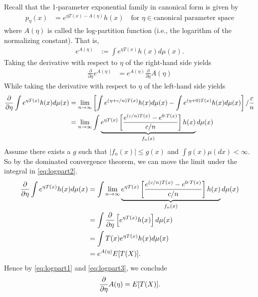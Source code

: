 \documentclass[twoside]{article}
\begin{document}
\begin{example}
Recall that the 1-parameter exponential family in canonical form is given by
\begin{align*}
  p_\eta(x) &= e^{\eta T(x) - A(\eta)} h(x) \quad \text{for }
  \eta \in \text{canonical parameter space}
\end{align*}
where $A(\eta)$ is called the log-partition function (i.e., the
logarithm of the normalizing constant).  That is,
\begin{align*}
  e^{A(\eta)} &:= \int e^{\eta T(x)} h(x) d\mu(x).
\end{align*}
Taking the derivative with respect to $\eta$ of the right-hand side yields
\begin{align}\label{eq:logpart1}
  \frac{\partial}{\partial \eta} e^{A(\eta)} &= e^{A(\eta)}
    \frac{\partial}{\partial \eta}A(\eta)
\end{align}
While taking the derivative with respect to $\eta$ of the left-hand side
yields
\begin{align}
  \frac{\partial}{\partial \eta} \int e^{\eta T(x)} h(x) d\mu(x)
  &= \lim_{n \rightarrow \infty} \left[ \int e^{(\eta + c/n)T(x)} h(x) d\mu(x) -
  \int e^{(\eta + 0)T(x)} h(x) d\mu(x) \right]/ \frac{c}{n} \notag\\
  &= \lim_{n \rightarrow \infty} \int \underbrace{e^{\eta T(x)} \left[
  \frac{e^{(c/n)T(x)} - e^{0 \cdot T(x)}}{c/n} \right] h(x)}_{f_n(x)} d\mu(x) \label{eq:logpart2}
\end{align}
Assume there exists a $g$ such that $|f_n(x)| \le g(x)$ and
$\int g(x) \mu(dx) < \infty$.  So by the dominated convergence theorem, we
can move the limit under the integral in \eqref{eq:logpart2}.
\begin{align}
   \frac{\partial}{\partial \eta} \int e^{\eta T(x)} h(x) d\mu(x)
  &=  \int \lim_{n \rightarrow \infty}\underbrace{e^{\eta T(x)} \left[
  \frac{e^{(c/n)T(x)} - e^{0 \cdot T(x)}}{c/n} \right] h(x)}_{f_n(x)} d\mu(x) \notag\\
  &= \int \frac{\partial}{\partial \eta} \left[e^{\eta T(x)} h(x)\right]  d\mu(x) \notag\\
  &= \int T(x) e^{\eta T(x)} h(x) d\mu(x)  \notag\\
  &= e^{A(\eta)} E[T(X)]. \label{eq:logpart3}
\end{align}
Hence by \eqref{eq:logpart1} and \eqref{eq:logpart3}, we conclude
\begin{align*}
\frac{\partial}{\partial \eta} A(\eta) = E[T(X)].
\end{align*}
\end{example}




\end{document}
